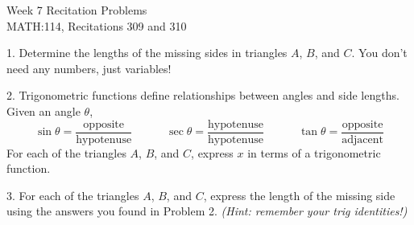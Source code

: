 \documentclass[11pt]{article}
\begin{document}
	\thispagestyle{empty}
	{
		\centering
		\huge{Week 7 Recitation Problems} \\
		\Large{MATH:114, Recitations 309 and 310} \\
	}
	\vspace{3em}
	
	1. Determine the lengths of the missing sides in triangles $A$, $B$, and $C$. You don't need any numbers, just variables!
		\vspace{2em}
		\begin{figure}[h!]
		\end{figure}
		
	\vspace{3em}
	2. Trigonometric functions define relationships between angles and side lengths. Given an angle $\theta$, $$\sin \theta = \frac{\text{opposite}}{\text{hypotenuse}} \hspace{3em} \sec \theta = \frac{\text{hypotenuse}}{\text{hypotenuse}} \hspace{3em} \tan \theta = \frac{\text{opposite}}{\text{adjacent}}$$
	For each of the triangles $A$, $B$, and $C$, express $x$ in terms of a trigonometric function.
	
	\vspace{0.2\paperheight}
	3. For each of the triangles $A$, $B$, and $C$, express the length of the missing side using the answers you found in Problem 2. \textit{(Hint: remember your trig identities!)}
	
\end{document}
